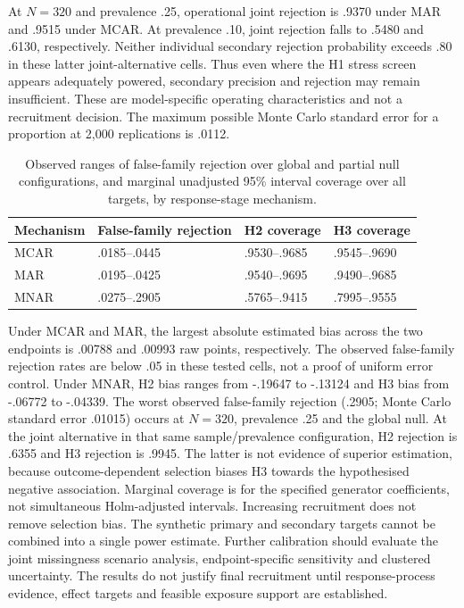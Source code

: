 \documentclass[11pt]{article}
\begin{document}
At $N=320$ and prevalence .25, operational joint rejection is .9370 under MAR and .9515 under MCAR. At prevalence .10, joint rejection falls to .5480 and .6130, respectively. Neither individual secondary rejection probability exceeds .80 in these latter joint-alternative cells. Thus even where the H1 stress screen appears adequately powered, secondary precision and rejection may remain insufficient. These are model-specific operating characteristics and not a recruitment decision. The maximum possible Monte Carlo standard error for a proportion at 2,000 replications is .0112.

\begin{table}[htbp]
\centering\small
\caption{Observed ranges of false-family rejection over global and partial null configurations, and marginal unadjusted 95\% interval coverage over all targets, by response-stage mechanism.}
\label{tab:secondary-calibration}
\begin{tabular}{@{}llll@{}}
\toprule
Mechanism & False-family rejection & H2 coverage & H3 coverage\\
\midrule
MCAR & .0185--.0445 & .9530--.9685 & .9545--.9690\\
MAR & .0195--.0425 & .9540--.9695 & .9490--.9685\\
MNAR & .0275--.2905 & .5765--.9415 & .7995--.9555\\
\bottomrule
\end{tabular}
\end{table}

Under MCAR and MAR, the largest absolute estimated bias across the two endpoints is .00788 and .00993 raw points, respectively. The observed false-family rejection rates are below .05 in these tested cells, not a proof of uniform error control. Under MNAR, H2 bias ranges from -.19647 to -.13124 and H3 bias from -.06772 to -.04339. The worst observed false-family rejection (.2905; Monte Carlo standard error .01015) occurs at $N=320$, prevalence .25 and the global null. At the joint alternative in that same sample/prevalence configuration, H2 rejection is .6355 and H3 rejection is .9945. The latter is not evidence of superior estimation, because outcome-dependent selection biases H3 towards the hypothesised negative association. Marginal coverage is for the specified generator coefficients, not simultaneous Holm-adjusted intervals. Increasing recruitment does not remove selection bias. The synthetic primary and secondary targets cannot be combined into a single power estimate. Further calibration should evaluate the joint missingness scenario analysis, endpoint-specific sensitivity and clustered uncertainty. The results do not justify final recruitment until response-process evidence, effect targets and feasible exposure support are established.
\end{document}
